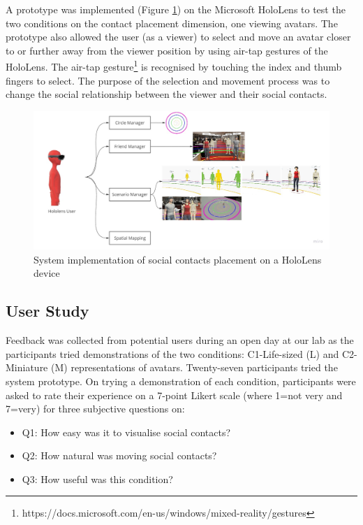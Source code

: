 A prototype was implemented (Figure \ref{fig:placement:system}) on the Microsoft HoloLens to test the two conditions on the contact placement dimension, one viewing avatars. The prototype also allowed the user (as a viewer) to select and move an avatar closer to or further away from the viewer position by using air-tap gestures of the HoloLens. The air-tap gesture\footnote{https://docs.microsoft.com/en-us/windows/mixed-reality/gestures} is recognised by touching the index and thumb fingers to select. The purpose of the selection and movement process was to change the social relationship between the viewer and their social contacts. 

\begin{figure}[ht]
    \centering
    \includegraphics[width=\linewidth]{images/42-placement-ismar17/placement-system.jpg}   
    \caption{System implementation of social contacts placement on a HoloLens device} 
    \label{fig:placement:system}
\end{figure}
\subsection{User Study}

Feedback was collected from potential users during an open day at our lab as the participants tried demonstrations of the two conditions: C1-Life-sized (L) and C2-Miniature (M) representations of avatars. Twenty-seven participants tried the system prototype. On trying a demonstration of each condition, participants were asked to rate their experience on a 7-point Likert scale (where 1=not very and 7=very) for three subjective questions on: 

\begin{itemize}
    \item Q1: How easy was it to visualise social contacts?
    \item Q2: How natural was moving social contacts?
    \item Q3: How useful was this condition?
\end{itemize}

